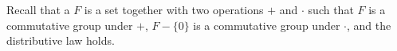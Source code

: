 Recall that a  $F$ is a set together with two operations $+$ and $\cdot$ such that $F$ is a commutative group under $+$, $F - \{0\}$ is a commutative group under $\cdot$, and the distributive law holds.
